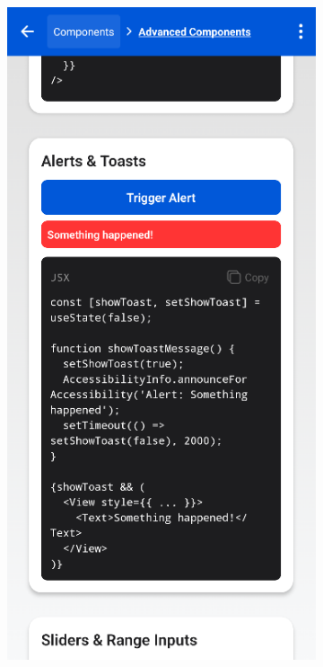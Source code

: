 \begin{figure}[ht]
    \centering
    \begin{subfigure}[b]{0.48\textwidth}
        \centering
        \includegraphics[width=\linewidth, alt={Third part of the Advanced screen}]{img/advanced3.png}

\end{subfigure}
\end{figure}
